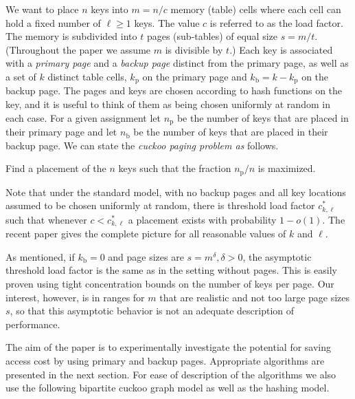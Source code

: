 \let\accentvec\vec \documentclass{llncs}
\newcommand{\nprim}{{n_{\mathrm{p}}}}
\newcommand{\nback}{{n_{\mathrm{b}}}}
\newcommand{\kprim}{{k_{\mathrm{p}}}}
\newcommand{\kback}{{k_{\mathrm{b}}}}
\begin{document}
We want to place $n$ keys into $m=n/c$ memory (table) cells where each cell can hold a fixed number of $\ell\geq 1$ keys.  The value $c$ is referred to 
as the load factor.  
The memory is subdivided into $t$ pages (sub-tables) of equal size $s=m/t$.  (Throughout the paper we assume
$m$ is divisible by $t$.)  Each key is associated with a \emph{primary page} 
and a \emph{backup page} distinct from the primary page, as well as a set of $k$ distinct table cells, $\kprim$ on the primary page and $\kback=k-\kprim$ on the backup page.  The pages and keys are chosen according to hash functions on the key, and it is useful to think of them as being chosen uniformly at random in each case. 
For a given assignment let $\nprim$ be the number of keys that are placed in their primary page and let $\nback$ be the number of keys that are placed in their backup page. We can state the \emph{cuckoo paging problem as} follows.

\begin{prob}
Find a placement of the $n$ keys such that the fraction ${\nprim}/{n}$ is maximized.
\end{prob}
\begin{remark}
Note that under the standard model, with no backup pages and all key locations
assumed to be chosen uniformly at random, there is threshold load factor $c^*_{k,\ell}$ such that whenever $c < c^*_{k,\ell}$ a placement exists with probability $1-o(1)$. The recent paper \cite{fountoulakis2011multiple} gives the complete picture for all reasonable values of $k$ and $\ell$.
\end{remark}


\begin{remark}As mentioned, if $\kback=0$ and page sizes are $s=m^\delta, \delta>0$,
the asymptotic threshold load factor is the same as in the setting without pages.
This is easily proven using tight concentration bounds on the number of keys per page.
Our interest, however, is in ranges for $m$ that are realistic and not too
large page sizes $s$, so that this asymptotic behavior is not an adequate description of performance.
\end{remark}

The aim of the paper is to experimentally investigate the potential
for saving access cost by using primary and backup pages. Appropriate
algorithms are presented in the next section. For ease of description
of the algorithms we also use the following bipartite cuckoo graph model as well as the
hashing model.
\end{document}

